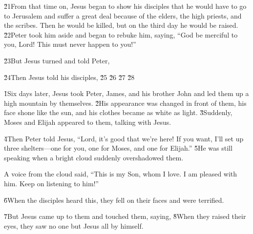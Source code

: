 \v{21}From that time on, Jesus began to show his disciples that he would have to go to Jerusalem and suffer a great deal because of the elders, the high priests, and the scribes. Then he would be killed, but on the third day he would be raised. \v{22}Peter took him aside and began to rebuke him, saying, ``God be merciful to you, Lord! This must never happen to you!''

\v{23}But Jesus turned and told Peter, 

\v{24}Then Jesus told his disciples,  \v{25} \v{26} \v{27} \v{28}

\v{1}Six days later, Jesus took Peter, James, and his brother John and led them up a high mountain by themselves. \v{2}His appearance was changed in front of them, his face shone like the sun, and his clothes became as white as light. \v{3}Suddenly, Moses and Elijah appeared to them, talking with Jesus.

\v{4}Then Peter told Jesus, ``Lord, it's good that we're here! If you want, I'll set up three shelters---one for you, one for Moses, and one for Elijah.'' \v{5}He was still speaking when a bright cloud suddenly overshadowed them.

A voice from the cloud said, ``This is my Son, whom I love. I am pleased with him. Keep on listening to him!''

\v{6}When the disciples heard this, they fell on their faces and were terrified.

\v{7}But Jesus came up to them and touched them, saying,  \v{8}When they raised their eyes, they saw no one but Jesus all by himself.

